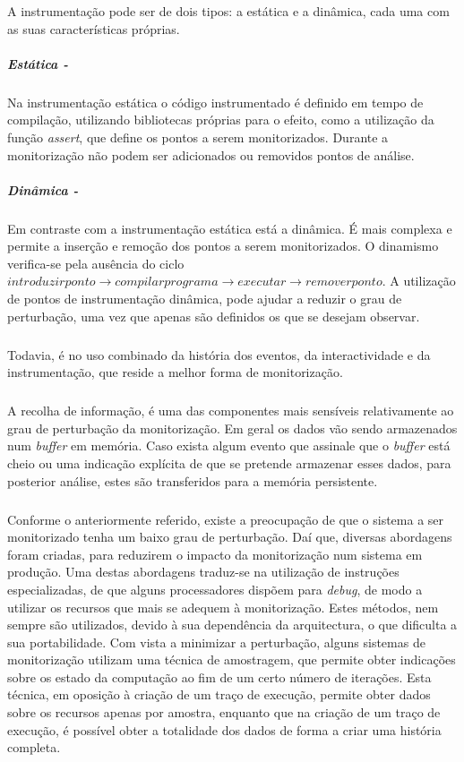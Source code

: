 \begin{itemize}
A instrumentação pode ser de dois tipos: a estática e a dinâmica, cada uma com as suas características próprias.

\subparagraph*{Estática - }

Na instrumentação estática o código instrumentado é definido em tempo de compilação, utilizando bibliotecas próprias para o efeito, como a utilização da função \textit{assert}, que define os pontos a serem monitorizados.
Durante a monitorização não podem ser adicionados ou removidos pontos de análise.

\subparagraph*{Dinâmica - }

Em contraste com a instrumentação estática está a dinâmica.
É mais complexa e permite a inserção e remoção dos pontos a serem monitorizados.
O dinamismo verifica-se pela ausência do ciclo $introduzir ponto\rightarrow compilar programa\rightarrow executar\rightarrow remover ponto$.
A utilização de pontos de instrumentação dinâmica, pode ajudar a reduzir o grau de perturbação, uma vez que apenas são definidos os que se desejam observar.
\end{itemize}

\subparagraph*{}
Todavia, é no uso combinado da história dos eventos, da interactividade e da instrumentação, que reside a melhor forma de monitorização.

\subparagraph*{
}
A recolha de informação, é uma das componentes mais sensíveis relativamente ao grau de perturbação da monitorização.
Em geral os dados vão sendo armazenados num \textit{buffer} em memória.
Caso exista algum evento que assinale que o \textit{buffer} está cheio ou uma indicação explícita de que se pretende armazenar esses dados, para posterior análise, estes são transferidos para a memória persistente.

\subparagraph*{
}
Conforme o anteriormente referido, existe a preocupação de que o sistema a ser monitorizado tenha um baixo grau de perturbação.
Daí que, diversas abordagens foram criadas, para reduzirem o impacto da monitorização num sistema em produção.
Uma destas abordagens traduz-se na utilização de instruções especializadas, de que alguns processadores dispõem para \textit{debug}, de modo a utilizar os recursos que mais se adequem à monitorização.
Estes métodos, nem sempre são utilizados, devido à sua dependência da arquitectura, o que dificulta a sua portabilidade.
Com vista a minimizar a perturbação, alguns sistemas de monitorização utilizam uma técnica de amostragem, que permite obter indicações sobre os estado da computação ao fim de um certo número de iterações.
Esta técnica, em oposição à criação de um traço de execução, permite obter dados sobre os recursos apenas por amostra, enquanto que na criação de um traço de execução, é possível obter a totalidade dos dados de forma a criar uma história completa.

